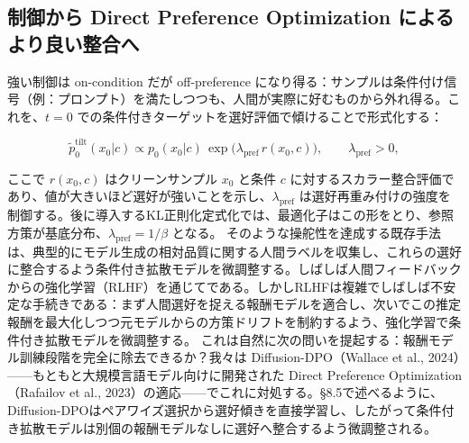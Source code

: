 \subsection*{制御から Direct Preference Optimization によるより良い整合へ}


強い制御は on-condition だが off-preference になり得る：サンプルは条件付け信号（例：プロンプト）を満たしつつも、人間が実際に好むものから外れ得る。これを、$t=0$ での条件付きターゲットを選好評価で傾けることで形式化する：

\[
\tilde{p}_0^{\mathrm{tilt}}(x_0|c)\propto p_0(x_0|c)\,\exp\bigl(\lambda_{\mathrm{pref}}\,r(x_0,c)\bigr),\qquad\lambda_{\mathrm{pref}}>0,
\]


ここで $r(x_0,c)$ はクリーンサンプル $x_0$ と条件 $c$ に対するスカラー整合評価であり、値が大きいほど選好が強いことを示し、$\lambda_{\mathrm{pref}}$ は選好再重み付けの強度を制御する。後に導入するKL正則化定式化では、最適化子はこの形をとり、参照方策が基底分布、$\lambda_{\mathrm{pref}}=1/\beta$ となる。
そのような操舵性を達成する既存手法は、典型的にモデル生成の相対品質に関する人間ラベルを収集し、これらの選好に整合するよう条件付き拡散モデルを微調整する。しばしば人間フィードバックからの強化学習（RLHF）を通じてである。しかしRLHFは複雑でしばしば不安定な手続きである：まず人間選好を捉える報酬モデルを適合し、次いでこの推定報酬を最大化しつつ元モデルからの方策ドリフトを制約するよう、強化学習で条件付き拡散モデルを微調整する。
これは自然に次の問いを提起する：報酬モデル訓練段階を完全に除去できるか？我々は Diffusion-DPO（Wallace et al., 2024）——もともと大規模言語モデル向けに開発された Direct Preference Optimization（Rafailov et al., 2023）の適応——でこれに対処する。§8.5で述べるように、Diffusion-DPOはペアワイズ選択から選好傾きを直接学習し、したがって条件付き拡散モデルは別個の報酬モデルなしに選好へ整合するよう微調整される。

